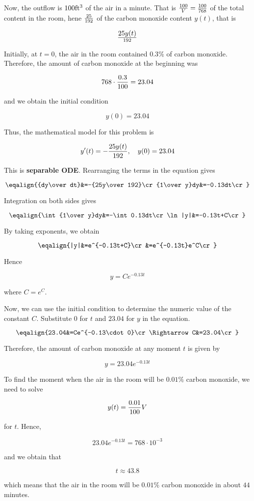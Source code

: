 \vskip 1mm
Now, the outflow is $100\hbox{ft$^3$}$ of the air in a minute. That is ${100\over V}={100\over 768}$ of the total content in the room, hene ${25\over 192}$ of the carbon monoxide content $y(t)$, that is

$${}25y(t)\over 192$$

Initially, at $t=0$, the air in the room contained $0.3\%$ of carbon monoxide. Therefore, the amount of carbon monoxide at the beginning was

$$768\cdot {0.3\over 100}=23.04$$

and we obtain the initial condition

$$y(0)=23.04$$

Thus, the mathematical model for this problem is

$$y'(t)=-{25y(t)\over 192},\quad y(0)=23.04$$

This is {\bf separable ODE}. Rearranging the terms in the equation gives

$$\eqalign{{dy\over dt}&=-{25y\over 192}\cr
		{1\over y}dy&=-0.13dt\cr}$$

Integration on both sides gives

$$\eqalign{\int{1\over y}dy&=-\int 0.13dt\cr
		\ln|y|&=-0.13t+C\cr}$$

By taking exponents, we obtain 

$$\eqalign{|y|&=e^{-0.13t+C}\cr
		&=e^{-0.13t}e^C\cr}$$

Hence

$$y=Ce^{-0.13t}$$

where $C=e^C$.

\vskip 1mm
Now, we can use the initial condition to determine the numeric value of the constant $C$. Substitute $0$ for $t$ and $23.04$ for $y$ in the equation.

$$\eqalign{23.04&=Ce^{-0.13\cdot 0}\cr
		\Rightarrow C&=23.04\cr}$$

Therefore, the amount of carbon monoxide at any moment $t$ is given by

$$y=23.04e^{-0.13t}$$

To find the moment when the air in the room will be $0.01\%$ carbon monoxide, we need to solve

$$y(t)={0.01\over 100}V$$

for $t$. Hence,

$$23.04e^{-0.13t}=768\cdot 10^{-3}$$

and we obtain that 

$$t\approx 43.8$$

which means that the air in the room will be $0.01\%$ carbon monoxide in about $44$ minutes.


\vfill\eject
\bye
